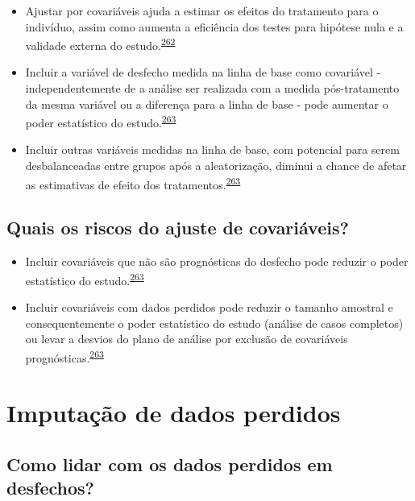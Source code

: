 \documentclass[
  a4paper,
]{book}
\begin{document}
\begin{itemize}
\item
  Ajustar por covariáveis ajuda a estimar os efeitos do tratamento para o indivíduo, assim como aumenta a eficiência dos testes para hipótese nula e a validade externa do estudo.\textsuperscript{\protect\hyperlink{ref-Hauck1998}{262}}
\item
  Incluir a variável de desfecho medida na linha de base como covariável - independentemente de a análise ser realizada com a medida pós-tratamento da mesma variável ou a diferença para a linha de base - pode aumentar o poder estatístico do estudo.\textsuperscript{\protect\hyperlink{ref-Kahan2014}{263}}
\item
  Incluir outras variáveis medidas na linha de base, com potencial para serem desbalanceadas entre grupos após a aleatorização, diminui a chance de afetar as estimativas de efeito dos tratamentos.\textsuperscript{\protect\hyperlink{ref-Kahan2014}{263}}
\end{itemize}

\hypertarget{quais-os-riscos-do-ajuste-de-covariuxe1veis}{%
\subsection{Quais os riscos do ajuste de covariáveis?}\label{quais-os-riscos-do-ajuste-de-covariuxe1veis}}

\begin{itemize}
\item
  Incluir covariáveis que não são prognósticas do desfecho pode reduzir o poder estatístico do estudo.\textsuperscript{\protect\hyperlink{ref-Kahan2014}{263}}
\item
  Incluir covariáveis com dados perdidos pode reduzir o tamanho amostral e consequentemente o poder estatístico do estudo (análise de casos completos) ou levar a desvios do plano de análise por exclusão de covariáveis prognósticas.\textsuperscript{\protect\hyperlink{ref-Kahan2014}{263}}
\end{itemize}

\hypertarget{imputacao-dados}{%
\section{Imputação de dados perdidos}\label{imputacao-dados}}

\hypertarget{como-lidar-com-os-dados-perdidos-em-desfechos}{%
\subsection{Como lidar com os dados perdidos em desfechos?}\label{como-lidar-com-os-dados-perdidos-em-desfechos}}
\end{document}
